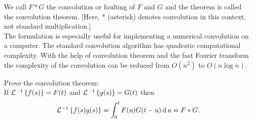 \documentclass[../main-sheet.tex]{subfiles}
\begin{document}
We call $ F*G $ the convolution or faulting of $ F $ and $ G $ and the theorem is called the convolution theorem. [Here, $ * $ (asterisk) denotes convolution in this context, not standard multiplication.]\\

The formulation is especially useful for implementing a numerical convolution on a computer. The standard convolution algorithm has quadratic computational complexity. With the help of convolution theorem and the fast Fourier transform the complexity of the convolution can be reduced from $ O(n^2) $ to $ O(n\log n) $.
\begin{prob}
    Prove the convolution theorem:\\
    If $ \mathcal{L}^{-1}\left\{ f(s)\right\}=F(t) $ and $ \mathcal{L}^{-1}\left\{ g(s)\right\}=G(t) $ then
    \[
        \mathcal{L}^{-1}\left\{ f(s)g(s)\right\}=\int_0^t F(u) G(t-u) \,\mathrm{d}\, u=F*G.
    \]
\end{prob}
\end{document}
